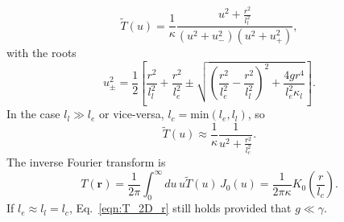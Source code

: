 \documentclass[aps, prb, reprint, superscriptaddress]{revtex4-2}
\renewcommand{\vec}{\mathbf}
\begin{document}
\begin{equation}
	\tilde{T}(u) = \frac{1}{\kappa}\frac{u^2 + \frac{r^2}{l_l^2}}{\left(u^2 + u_{-}^2\right)\left(u^2 + u_+^2\right)},  \label{eqn:T_elec_GF} 
\end{equation}
with the roots  
\begin{equation}
	u_{\pm}^2 = \frac{1}{2} \left[\frac{r^2}{l_l^2} + \frac{r^2}{l_e^2} \pm \sqrt{\left(\frac{r^2}{l_e^2} - \frac{r^2}{l_l^2}\right)^2 +  \frac{4gr^4}{l_e^2\kappa_l}}\right]. 
	\label{eqn:T_roots}
\end{equation}
In the case $l_l\gg l_e$ or vice-versa, $l_c = \mathrm{min}(l_e, l_l)$, so 
\begin{equation}
	\tilde{T}(u)\approx \frac{1}{\kappa} \frac{1}{u^2 + \frac{r^2}{l_c^2}}.
	\label{eqn:T_2D} 
\end{equation}
The inverse Fourier transform is
\begin{equation}
	T(\vec{r}) = \frac{1}{2\pi}\int_0^\infty du \,  u \tilde{T}(u) \, J_0(u) = \frac{1}{2\pi\kappa} K_0\left(\frac{r}{l_c}\right). 
	\label{eqn:T_2D_r}
\end{equation}
If $l_e \approx l_l = l_c$, Eq.~\eqref{eqn:T_2D_r} still holds provided that $g\ll\gamma$. 
\end{document}

